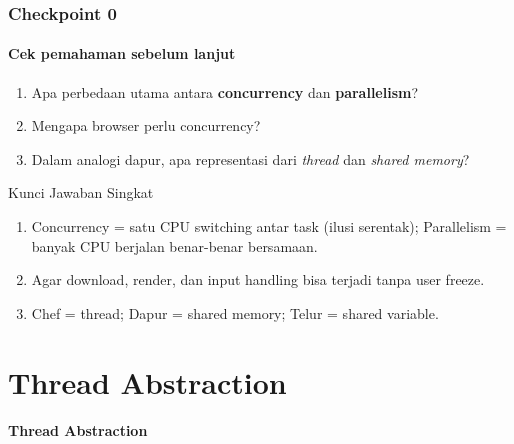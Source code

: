 \documentclass[t,aspectratio=169,xcolor=dvipsnames]{beamer}
\begin{document}
\begin{frame}
    \frametitle{Checkpoint 0}
    \framesubtitle{Cek pemahaman sebelum lanjut}
    \small

    \begin{enumerate}
        \item Apa perbedaan utama antara \textbf{concurrency} dan \textbf{parallelism}?
        \item Mengapa browser perlu concurrency?
        \item Dalam analogi dapur, apa representasi dari \textit{thread} dan \textit{shared memory}?
    \end{enumerate}

    \vspace{0.3cm}
    \begin{block}{Kunci Jawaban Singkat}
        \small
        \begin{enumerate}
            \item Concurrency = satu CPU switching antar task (ilusi serentak); Parallelism = banyak CPU berjalan benar-benar bersamaan.
            \item Agar download, render, dan input handling bisa terjadi tanpa user freeze.
            \item Chef = thread; Dapur = shared memory; Telur = shared variable.
        \end{enumerate}
    \end{block}
\end{frame}

\section{Thread Abstraction}

\begin{frame}[plain]
    \begin{center}
        \vspace{3cm}
        \Huge\textbf{Thread Abstraction}
    \end{center}
\end{frame}
\end{document}
